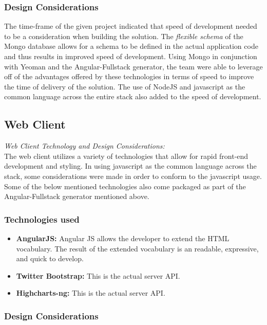 \documentclass[12pt]{witseiepaper}
\begin{document}
\subsubsection{Design Considerations} 
The time-frame of the given project indicated that speed of development needed to be a consideration when building the solution. The \textit{flexible schema} of the Mongo database allows for a schema to be defined in the actual application code and thus results in improved speed of development. Using Mongo in conjunction with Yeoman and the Angular-Fullstack generator, the team were able to leverage off of the advantages offered by these technologies in terms of speed to improve the time of delivery of the solution. The use of NodeJS and javascript as the common language across the entire stack also added to the speed of development.

\subsection{Web Client}
\textit{Web Client Technology and Design Considerations:} \\
The web client utilizes a variety of technologies that allow for rapid front-end development and styling. In using javascript as the common language across the stack, some considerations were made in order to conform to the javascript usage. Some of the below mentioned technologies also come packaged as part of the Angular-Fullstack generator mentioned above.

\subsubsection{Technologies used} 
\begin{itemize}
	\item \textbf{AngularJS:} Angular JS allows the developer to extend the HTML vocabulary. The result of the extended vocabulary is an readable, expressive,  and quick to develop.
	\item \textbf{Twitter Bootstrap:} This is the actual server API.
	\item \textbf{Highcharts-ng:} This is the actual server API.
\end{itemize}

\subsubsection{Design Considerations} 
\end{document}
